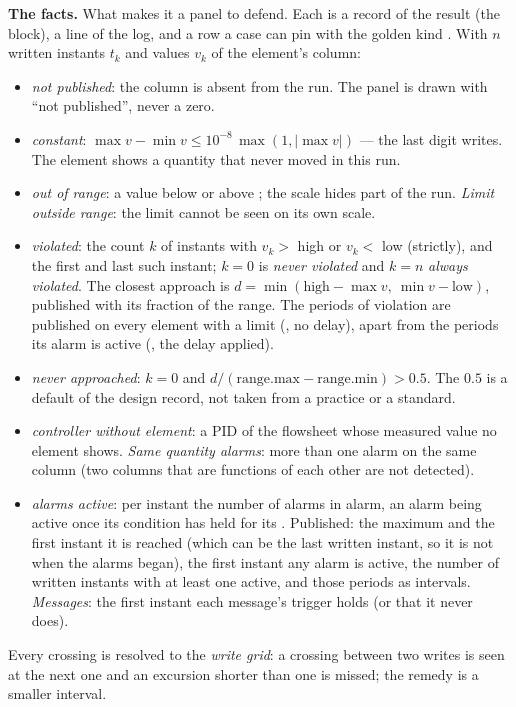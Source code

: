 \documentclass[11pt,a4paper]{article}
\begin{document}
\textbf{The facts.} What makes it a panel to defend. Each is a record of the
result (the  block), a \code{[panel]} line of the log, and a row
a case can pin with the golden kind . With $n$ written
instants $t_k$ and values $v_k$ of the element's column:
\begin{itemize}
\item \emph{not published}: the column is absent from the run. The panel is
 drawn with ``not published'', never a zero.
\item \emph{constant}: $\max v - \min v \le 10^{-8}\,\max(1,|\max v|)$ ---
 the last digit  writes. The element shows a quantity
 that never moved in this run.
\item \emph{out of range}: a value below  or above
 ; the scale hides part of the run. \emph{Limit outside
 range}: the limit cannot be seen on its own scale.
\item \emph{violated}: the count $k$ of instants with $v_k>$ high or $v_k<$
 low (strictly), and the first and last such instant; $k=0$ is
 \emph{never violated} and $k=n$ \emph{always violated}. The closest
 approach is $d=\min(\text{high}-\max v,\ \min v-\text{low})$, published
 with its fraction of the range. The periods of violation are published on
 every element with a limit (, no delay), apart from
 the periods its alarm is active (, the delay applied).
\item \emph{never approached}: $k=0$ and $d/(\text{range.max}-\text{range.min})
 > 0.5$. The $0.5$ is a default of the design record, not taken from a
 practice or a standard.
\item \emph{controller without element}: a PID of the flowsheet whose measured
 value no element shows. \emph{Same quantity alarms}: more than one alarm on
 the same column (two columns that are functions of each other are not
 detected).
\item \emph{alarms active}: per instant the number of alarms in alarm, an
 alarm being active once its condition has held for its . Published:
 the maximum and the first instant it is reached (which can be the last
 written instant, so it is not when the alarms began), the first instant any
 alarm is active, the number of written instants with at least one active,
 and those periods as intervals. \emph{Messages}: the first
 instant each message's trigger holds (or that it never does).
\end{itemize}
Every crossing is resolved to the \emph{write grid}: a crossing between two
writes is seen at the next one and an excursion shorter than one
 is missed; the remedy is a smaller interval.
\end{document}
